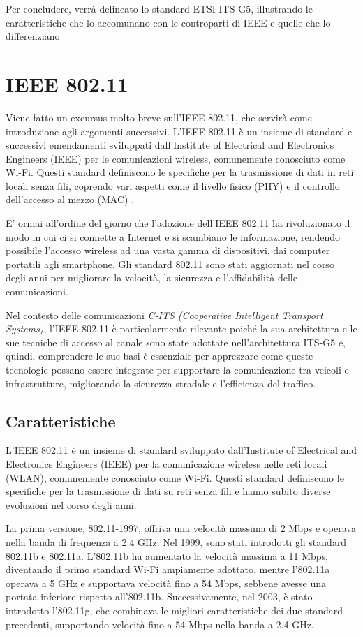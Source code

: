 Per concludere, verrà delineato lo standard ETSI ITS-G5, illustrando le caratteristiche che lo accomunano con le controparti di IEEE e quelle che lo differenziano

\section{IEEE 802.11}
Viene fatto un excursus molto breve sull'IEEE 802.11, che servirà come introduzione agli argomenti successivi. L'IEEE 802.11 è un insieme di standard e successivi emendamenti sviluppati dall'Institute of Electrical and Electronics Engineers (IEEE) per le comunicazioni wireless, comunemente conosciuto come Wi-Fi. Questi standard definiscono le specifiche per la trasmissione di dati in reti locali senza fili, coprendo vari aspetti come il livello fisico (PHY) e il controllo dell'accesso al mezzo (MAC) \cite{ieee80211}.

E' ormai all'ordine del giorno che l'adozione dell'IEEE 802.11 ha rivoluzionato il modo in cui ci si connette a Internet e si scambiano le informazione, rendendo possibile l'accesso wireless ad una vasta gamma di dispositivi, dai computer portatili agli smartphone. Gli standard 802.11 sono stati aggiornati nel corso degli anni per migliorare la velocità, la sicurezza e l'affidabilità delle comunicazioni.

Nel contesto delle comunicazioni \textit{C-ITS (Cooperative Intelligent Transport Systems)}, l'IEEE 802.11 è particolarmente rilevante poiché la sua architettura e le sue tecniche di accesso al canale sono state adottate nell'architettura ITS-G5 \cite{etsi302} e, quindi, comprendere le sue basi è essenziale per apprezzare come queste tecnologie possano essere integrate per supportare la comunicazione tra veicoli e infrastrutture, migliorando la sicurezza stradale e l'efficienza del traffico.

\subsection[Caratteristiche]{Caratteristiche}
L'IEEE 802.11 è un insieme di standard sviluppato dall'Institute of Electrical and Electronics Engineers (IEEE) per la comunicazione wireless nelle reti locali (WLAN), comunemente conosciuto come Wi-Fi. Questi standard definiscono le specifiche per la trasmissione di dati su reti senza fili e hanno subito diverse evoluzioni nel corso degli anni.

La prima versione, 802.11-1997, offriva una velocità massima di 2 Mbps e operava nella banda di frequenza a 2.4 GHz. Nel 1999, sono stati introdotti gli standard 802.11b e 802.11a. L'802.11b ha aumentato la velocità massima a 11 Mbps, diventando il primo standard Wi-Fi ampiamente adottato, mentre l'802.11a operava a 5 GHz e supportava velocità fino a 54 Mbps, sebbene avesse una portata inferiore rispetto all'802.11b. Successivamente, nel 2003, è stato introdotto l'802.11g, che combinava le migliori caratteristiche dei due standard precedenti, supportando velocità fino a 54 Mbps nella banda a 2.4 GHz.

